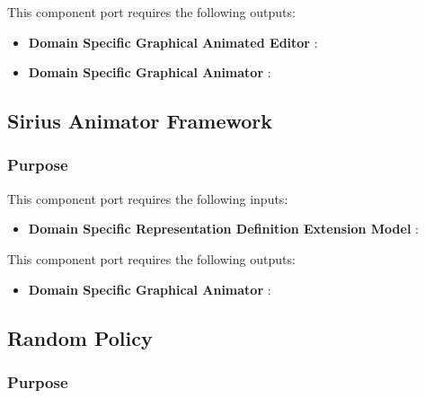 \documentclass{gemoc} %
\begin{document}
This component port requires the following outputs:
\begin{itemize}
  \item \textbf{Domain Specific Graphical Animated Editor} :
  \item \textbf{Domain Specific Graphical Animator} :
\end{itemize}

\subsection{Sirius Animator Framework}


\subsubsection{Purpose}

This component port requires the following inputs:
\begin{itemize}
  \item \textbf{Domain Specific Representation Definition Extension Model} :
\end{itemize}

This component port requires the following outputs:
\begin{itemize}
  \item \textbf{Domain Specific Graphical Animator} :
\end{itemize}

\subsection{Random Policy}


\subsubsection{Purpose}
\end{document}

